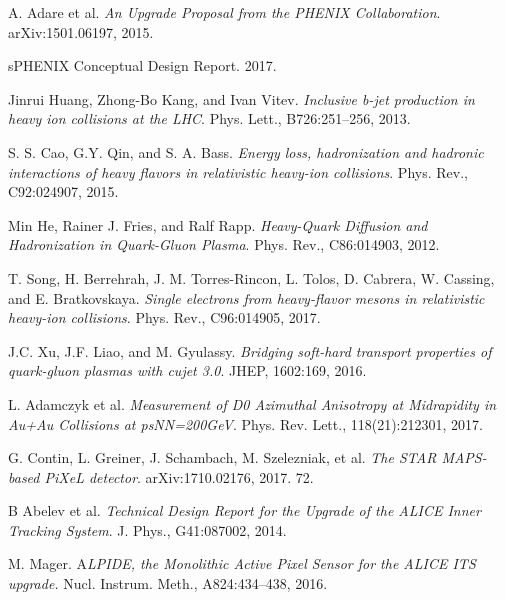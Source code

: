 A. Adare et al. \textit{An Upgrade Proposal from the PHENIX Collaboration}. arXiv:1501.06197, 2015.

 sPHENIX Conceptual Design Report. 2017.

 Jinrui Huang, Zhong-Bo Kang, and Ivan Vitev. \textit{Inclusive b-jet production in heavy ion collisions at the LHC}. Phys. Lett., B726:251–256, 2013.

 S. S. Cao, G.Y. Qin, and S. A. Bass. \textit{Energy loss, hadronization and hadronic interactions of heavy flavors in relativistic heavy-ion collisions}. Phys. Rev., C92:024907, 2015.

 Min He, Rainer J. Fries, and Ralf Rapp. \textit{Heavy-Quark Diffusion and Hadronization in Quark-Gluon Plasma}. Phys. Rev., C86:014903, 2012.

 T. Song, H. Berrehrah, J. M. Torres-Rincon, L. Tolos, D. Cabrera, W. Cassing, and E. Bratkovskaya. \textit{Single electrons from heavy-flavor mesons in relativistic heavy-ion collisions}. Phys. Rev., C96:014905, 2017.

 J.C. Xu, J.F. Liao, and M. Gyulassy. \textit{Bridging soft-hard transport properties of quark-gluon plasmas with cujet 3.0}. JHEP, 1602:169, 2016.

  L. Adamczyk et al. \textit{Measurement of D0 Azimuthal Anisotropy at Midrapidity in Au+Au Collisions at psNN=200GeV}. Phys. Rev. Lett., 118(21):212301, 2017.


 G. Contin, L. Greiner, J. Schambach, M. Szelezniak, et al. \textit{The STAR MAPS-based PiXeL detector}. arXiv:1710.02176, 2017. 72.

 B Abelev et al. \textit{Technical Design Report for the Upgrade of the ALICE Inner Tracking System}. J. Phys., G41:087002, 2014.

 M. Mager. A\textit{LPIDE, the Monolithic Active Pixel Sensor for the ALICE ITS upgrade.} Nucl. Instrum. Meth., A824:434–438, 2016.